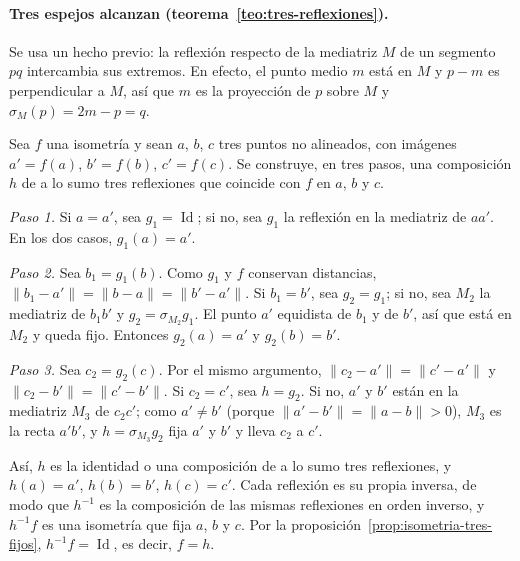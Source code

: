 \paragraph{Tres espejos alcanzan (teorema~\ref{teo:tres-reflexiones}).}
\begin{demostracion}
Se usa un hecho previo: la reflexión respecto de la mediatriz \(M\) de un segmento \(pq\)
intercambia sus extremos. En efecto, el punto medio \(m\) está en \(M\) y \(p-m\) es
perpendicular a \(M\), así que \(m\) es la proyección de \(p\) sobre \(M\) y
\(\sigma_{M}(p)=2m-p=q\).

Sea \(f\) una isometría y sean \(a\), \(b\), \(c\) tres puntos no alineados, con imágenes
\(a'=f(a)\), \(b'=f(b)\), \(c'=f(c)\). Se construye, en tres pasos, una composición \(h\) de a
lo sumo tres reflexiones que coincide con \(f\) en \(a\), \(b\) y \(c\).

\emph{Paso 1.} Si \(a=a'\), sea \(g_1=\operatorname{Id}\); si no, sea \(g_1\) la reflexión en
la mediatriz de \(aa'\). En los dos casos, \(g_1(a)=a'\).

\emph{Paso 2.} Sea \(b_1=g_1(b)\). Como \(g_1\) y \(f\) conservan distancias,
\(\lVert b_1-a'\rVert=\lVert b-a\rVert=\lVert b'-a'\rVert\). Si \(b_1=b'\), sea \(g_2=g_1\); si
no, sea \(M_2\) la mediatriz de \(b_1b'\) y \(g_2=\sigma_{M_2}g_1\). El punto \(a'\) equidista de
\(b_1\) y de \(b'\), así que está en \(M_2\) y queda fijo. Entonces \(g_2(a)=a'\) y
\(g_2(b)=b'\).

\emph{Paso 3.} Sea \(c_2=g_2(c)\). Por el mismo argumento,
\(\lVert c_2-a'\rVert=\lVert c'-a'\rVert\) y \(\lVert c_2-b'\rVert=\lVert c'-b'\rVert\). Si
\(c_2=c'\), sea \(h=g_2\). Si no, \(a'\) y \(b'\) están en la mediatriz \(M_3\) de \(c_2c'\);
como \(a'\neq b'\) (porque \(\lVert a'-b'\rVert=\lVert a-b\rVert>0\)), \(M_3\) es la recta
\(a'b'\), y \(h=\sigma_{M_3}g_2\) fija \(a'\) y \(b'\) y lleva \(c_2\) a \(c'\).

Así, \(h\) es la identidad o una composición de a lo sumo tres reflexiones, y \(h(a)=a'\),
\(h(b)=b'\), \(h(c)=c'\). Cada reflexión es su propia inversa, de modo que \(h^{-1}\) es la
composición de las mismas reflexiones en orden inverso, y \(h^{-1}f\) es una isometría que fija
\(a\), \(b\) y \(c\). Por la proposición~\ref{prop:isometria-tres-fijos}, \(h^{-1}f=\operatorname{Id}\),
es decir, \(f=h\).
\end{demostracion}

